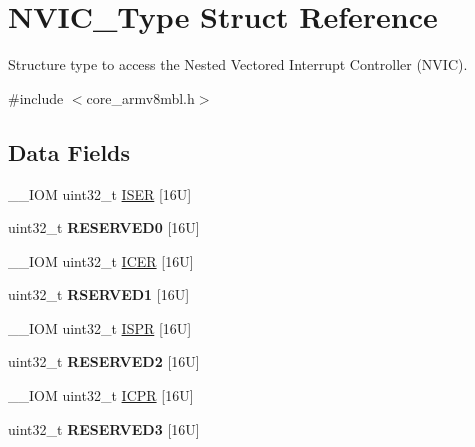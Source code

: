 \hypertarget{struct_n_v_i_c___type}{}\section{N\+V\+I\+C\+\_\+\+Type Struct Reference}
\label{struct_n_v_i_c___type}


Structure type to access the Nested Vectored Interrupt Controller (N\+V\+IC).  




{\ttfamily \#include $<$core\+\_\+armv8mbl.\+h$>$}

\subsection*{Data Fields}
\begin{DoxyCompactItemize}
\item 
\+\_\+\+\_\+\+I\+OM uint32\+\_\+t \hyperlink{struct_n_v_i_c___type_a06726c729c5557701defc4d6b5d8f9f6}{I\+S\+ER} \mbox{[}16\+U\mbox{]}
\item 
\mbox{\label{struct_n_v_i_c___type_a114b23ee6f1540603908adaedaecc477}} 
uint32\+\_\+t {\bfseries R\+E\+S\+E\+R\+V\+E\+D0} \mbox{[}16\+U\mbox{]}
\item 
\+\_\+\+\_\+\+I\+OM uint32\+\_\+t \hyperlink{struct_n_v_i_c___type_aed882e10ea8ee6a915007af71643d7da}{I\+C\+ER} \mbox{[}16\+U\mbox{]}
\item 
\mbox{\label{struct_n_v_i_c___type_adb1d396e2b2209db1e9a45dd2ed27ca3}} 
uint32\+\_\+t {\bfseries R\+S\+E\+R\+V\+E\+D1} \mbox{[}16\+U\mbox{]}
\item 
\+\_\+\+\_\+\+I\+OM uint32\+\_\+t \hyperlink{struct_n_v_i_c___type_a288bc5e8b844a531a6ecdcc8dbcb8050}{I\+S\+PR} \mbox{[}16\+U\mbox{]}
\item 
\mbox{\label{struct_n_v_i_c___type_a8ed6bf06e09e4ebc57e591fde22c70c3}} 
uint32\+\_\+t {\bfseries R\+E\+S\+E\+R\+V\+E\+D2} \mbox{[}16\+U\mbox{]}
\item 
\+\_\+\+\_\+\+I\+OM uint32\+\_\+t \hyperlink{struct_n_v_i_c___type_aa056e3f59e88845ee47db4a43635b3a2}{I\+C\+PR} \mbox{[}16\+U\mbox{]}
\item 
\mbox{\label{struct_n_v_i_c___type_a33fe3d6f15f4d638ac6a10a370e6f8ed}} 
uint32\+\_\+t {\bfseries R\+E\+S\+E\+R\+V\+E\+D3} \mbox{[}16\+U\mbox{]}

\end{DoxyCompactItemize}
